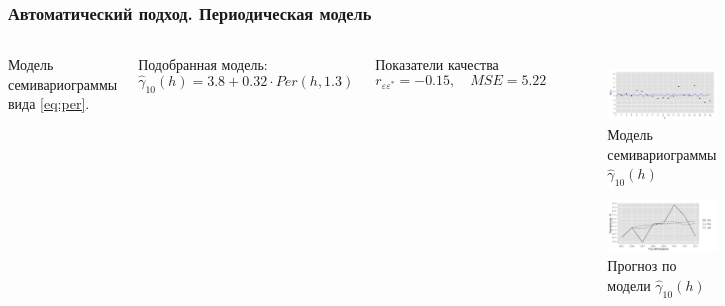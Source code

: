 \documentclass[10pt,pdf,aspectratio=169,hyperref={unicode}]{beamer}
\begin{document}
\begin{frame}
  \frametitle{Автоматический подход. \small{Периодическая модель}}
  \begin{columns}[c]
  \column{3in}
  Модель семивариограммы вида \eqref{eq:per}.

  \vspace{0.5em}

  Подобранная модель:
  \begin{equation}
  \label{eq:gamma10}
    \widehat{\gamma}_{10}(h) = 3.8 + 0.32 \cdot Per(h, 1.3)
  \end{equation}

  Показатели качества
  \begin{equation*}
    r_{\varepsilon\varepsilon^{*}} = -0.15, \quad MSE = 5.22
  \end{equation*}

  \column{3in}
  \vspace{-14.5pt}
  \begin{figure}[H]
    \includegraphics[width=0.9\linewidth]{../../figures/variogram/auto-class-18-modeled.png} \\
    \caption{Модель семивариограммы $\widehat{\gamma}_{10}(h)$}
    \includegraphics[width=0.9\linewidth]{../../figures/variogram/auto-class-18-cross-prediction.png}
    \caption{Прогноз по модели $\widehat{\gamma}_{10}(h)$}
  \end{figure}
  \end{columns}
\end{frame}
\end{document}
